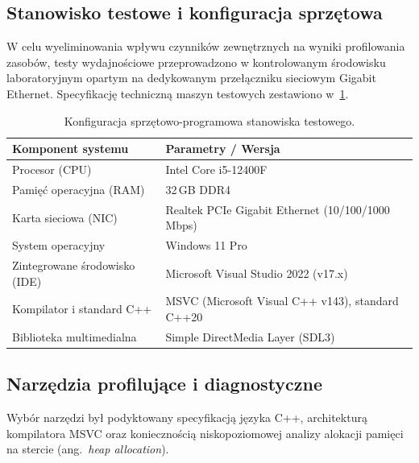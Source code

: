 \subsection{Stanowisko testowe i konfiguracja sprzętowa}
\label{subsec:db_stanowisko}

W celu wyeliminowania wpływu czynników zewnętrznych na wyniki profilowania
zasobów, testy wydajnościowe przeprowadzono w kontrolowanym środowisku
laboratoryjnym opartym na dedykowanym przełączniku sieciowym Gigabit Ethernet.
Specyfikację techniczną maszyn testowych zestawiono w~\cref{tab:db_specyfikacja}.

\begin{table}[htbp]
	\centering
	\caption{Konfiguracja sprzętowo-programowa stanowiska testowego.}
	\label{tab:db_specyfikacja}
	\begin{tabular}{|l|l|}
		\hline
		\textbf{Komponent systemu}          & \textbf{Parametry / Wersja}                          \\ \hline
		Procesor (CPU)                      & Intel Core i5-12400F                                 \\ \hline
		Pamięć operacyjna (RAM)             & 32\,GB DDR4                                          \\ \hline
		Karta sieciowa (NIC)                & Realtek PCIe Gigabit Ethernet (10/100/1000\,Mbps)    \\ \hline
		System operacyjny                   & Windows 11 Pro                                       \\ \hline
		Zintegrowane środowisko (IDE)       & Microsoft Visual Studio 2022 (v17.x)                 \\ \hline
		Kompilator i standard C++           & MSVC (Microsoft Visual C++ v143), standard C++20     \\ \hline
		Biblioteka multimedialna            & Simple DirectMedia Layer (SDL3) \cite{SDL3}          \\ \hline
	\end{tabular}
\end{table}

\subsection{Narzędzia profilujące i diagnostyczne}
\label{subsec:db_narzedzia}

Wybór narzędzi był podyktowany specyfikacją języka C++, architekturą
kompilatora MSVC oraz koniecznością niskopoziomowej analizy alokacji pamięci
na stercie (ang.~\textit{heap allocation}).

